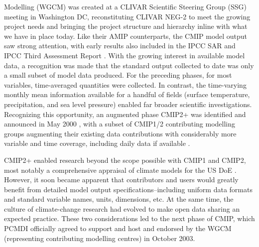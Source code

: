 \documentclass[gmd, preprint]{copernicus}
\newcommand{\mycomment}[1]{}
\begin{document}
Modelling (WGCM) was created at a CLIVAR Scientific Steering Group (SSG) meeting in Washington DC, reconstituting CLIVAR NEG-2 to meet the growing project needs \citep{detemmerman_clivar_1997} and bringing the project structure and hierarchy inline with what we have in place today. Like their AMIP counterparts, the CMIP model output saw strong attention, with early results also included in the IPCC SAR \citep{gates_climate_1996} and IPCC Third Assessment Report \citep[TAR;][]{mcavaney_model_2001}. With the growing interest in available model data, a recognition was made that the standard output collected to date was only a small subset of model data produced. For the preceding phases, for most variables, time-averaged quantities were collected. In contrast, the time-varying monthly mean information available for a handful of fields (surface temperature, precipitation, and sea level pressure) enabled far broader scientific investigations. Recognizing this opportunity, an augmented phase CMIP2+ was identified and announced in May 2000 \citep{villwock_6th_2003, meehl_cmip_2003, meehl_overview_2005}, with a subset of CMIP1/2 contributing modelling groups augmenting their existing data contributions with considerably more variable and time coverage, including daily data if available \citep{achutarao_pcmdi_2004}.

CMIP2+ enabled research beyond the scope possible with CMIP1 and CMIP2, most notably a comprehensive appraisal of climate models for the US DoE \citep{achutarao_pcmdi_2004}. However, it soon became apparent that contributors and users would greatly benefit from detailed model output specifications--including uniform data formats and standard variable names, units, dimensions, etc. At the same time, the culture of climate-change research had evolved to make open data sharing an expected practice. These two considerations led to the next phase of CMIP, which PCMDI officially agreed to support and host and endorsed by the WGCM (representing contributing modelling centres) in October 2003.

\mycomment{
Curt C to provide a sentence or two about the dramatic growth of the registered subprojects that had been the standard engagement way in AMIP1/2, CMIP1/2 and how that
led to the opening up of the CMIP3 archive to open-access FTP, and no registered subprojects? - If I have that right? (already above)

WGOMD establishment after WGCM-2 in Melbourne Oct 1998 - see https://eprints.soton.ac.uk/30149/1/040_wgcm4.pdf#Page=9 /sect3.5 also JSC-21 also see https://www.wcrp-climate.org/modelling-wgcm-publications
CMIP1/2/2+ announcement emails for timing - https://web.archive.org/web/20040827091054/http://www-pcmdi.llnl.gov/cmip/
Also PMIP 1991 - prescribed SSTs AGCMs \citep{braconnot_paleoclimate_2011} \textbf{(Karl to help here)}
Also AMIP2 proceedings, Gleckler et al 2005 - https://pcmdi.llnl.gov/mips/amip/amip2_workshop_proceedings.pdf#page=11 - https://www.osti.gov/biblio/15014509
And Potter 1999 - new strategy beyond AMIP - https://www.osti.gov/biblio/791127
Also Meehl 2019 https://www.wcrp-climate.org/images/AGU2019/presentations/Symposium/11-Meehl_WCRP40.pdf
}
\end{document}
